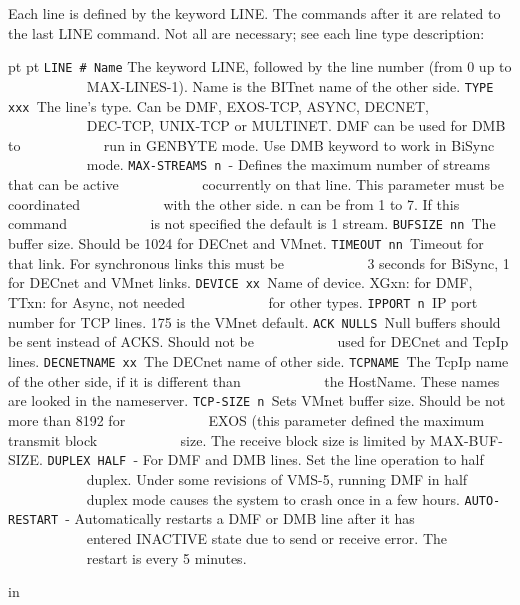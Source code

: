 Each line is defined by the keyword LINE.  The  commands  after  it  are
related  to  the last LINE command. Not all are necessary; see each line
type description:

{\obeylines\obeyspaces{} pt  pt
{\tt LINE \# Name} The keyword LINE, followed by the line number (from 0 up to
{\tt ~~~~~~~~~~~}MAX-LINES-1). Name is the BITnet name of the other side.
{\tt TYPE xxx   }The line's type. Can be DMF, EXOS-TCP, ASYNC, DECNET,
{\tt ~~~~~~~~~~~}DEC-TCP, UNIX-TCP or MULTINET. DMF can be used  for  DMB  to
{\tt ~~~~~~~~~~~}run  in  GENBYTE  mode.  Use  DMB keyword to work in BiSync
{\tt ~~~~~~~~~~~}mode.
{\tt MAX-STREAMS n }- Defines the maximum number of streams that can be active
{\tt ~~~~~~~~~~~}cocurrently on that line. This parameter must be coordinated
{\tt ~~~~~~~~~~~}with the other side. n can be from 1 to 7. If  this  command
{\tt ~~~~~~~~~~~}is not specified the default is 1 stream.
{\tt BUFSIZE nn }The buffer size. Should be 1024 for DECnet and VMnet.
{\tt TIMEOUT nn }Timeout for that link. For synchronous links this must be
{\tt ~~~~~~~~~~~}3 seconds for BiSync, 1 for DECnet and VMnet links.
{\tt DEVICE xx  }Name of device. XGxn: for DMF, TTxn: for Async, not needed
{\tt ~~~~~~~~~~~}for other types.
{\tt IPPORT n   }IP port number for TCP lines. 175 is the VMnet default.
{\tt ACK NULLS  }Null buffers should be sent instead of ACKS. Should not be
{\tt ~~~~~~~~~~~}used for DECnet and TcpIp lines.
{\tt DECNETNAME xx }The DECnet name of other side.
{\tt TCPNAME    }The TcpIp name of the other side, if it is different than
{\tt ~~~~~~~~~~~}the HostName. These names are looked in the nameserver.
{\tt TCP-SIZE n }Sets VMnet buffer size. Should be not more than 8192 for
{\tt ~~~~~~~~~~~}EXOS (this parameter defined the maximum transmit block
{\tt ~~~~~~~~~~~}size. The receive block size is limited by MAX-BUF-SIZE.
{\tt DUPLEX  HALF }-  For  DMF  and DMB lines. Set the line operation to half
{\tt ~~~~~~~~~~~}duplex. Under some revisions of VMS-5, running DMF  in  half
{\tt ~~~~~~~~~~~}duplex mode causes the system to crash once in a few hours.
{\tt AUTO-RESTART }-  Automatically  restarts  a DMF or DMB line after it has
{\tt ~~~~~~~~~~~}entered INACTIVE state due to send  or  receive  error.  The
{\tt ~~~~~~~~~~~}restart is every 5 minutes.
}

 in

